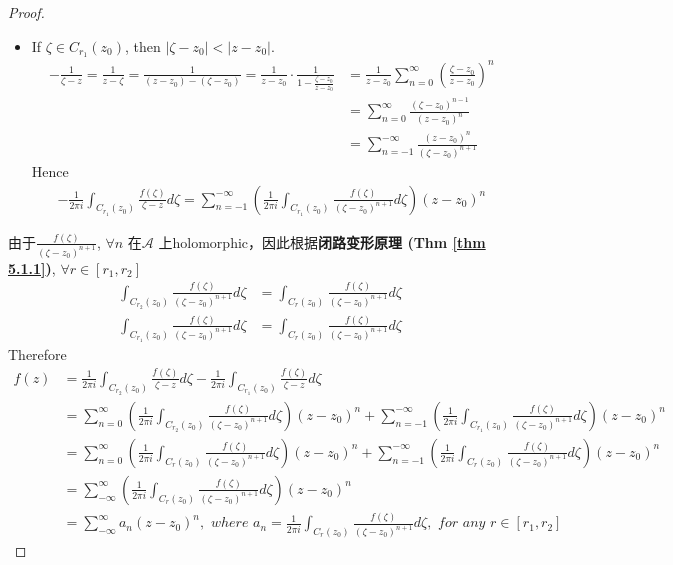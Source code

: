 \begin{thm}
\begin{proof}
\begin{itemize}
			\item If $\zeta \in C_{r_1}(z_0)$, then $\left| \zeta - z_0 \right| < \left| z - z_0 \right|$.
			\begin{align}
				-\frac{1}{\zeta - z} 
				= \frac{1}{z - \zeta}
				= \frac{1}{(z - z_0) - (\zeta - z_0)}
				= \frac{1}{z - z_0} \cdot \frac{1}{1 - \frac{\zeta - z_0}{z - z_0}}
				&= \frac{1}{z - z_0} \sum_{n = 0}^{\infty}{\left( \frac{\zeta - z_0}{z - z_0} \right)^n} \\
				&= \sum_{n = 0}^{\infty}{\frac{(\zeta - z_0)^{n - 1}}{(z - z_0)^n}} \\
				&= \sum_{n = -1}^{-\infty}{\frac{(z - z_0)^n}{(\zeta - z_0)^{n + 1}}}
			\end{align}
			Hence
			\begin{align}
				-\frac{1}{2\pi i} \int_{C_{r_1}(z_0)}{\frac{f(\zeta)}{\zeta - z} d\zeta}
				= \sum_{n = -1}^{-\infty}{\left( \frac{1}{2\pi i} \int_{C_{r_1}(z_0)}{\frac{f(\zeta)}{(\zeta - z_0)^{n + 1}} d\zeta} \right) (z - z_0)^n}
			\end{align}
		\end{itemize}
		由于$\frac{f(\zeta)}{(\zeta - z_0)^{n + 1}}$, $\forall n$ 在$\mathcal{A}$ 上holomorphic，因此根据\textbf{闭路变形原理 (Thm \ref{thm 5.1.1})}, $\forall r \in [r_1 , r_2]$
		\begin{align}
			\int_{C_{r_2}(z_0)}{\frac{f(\zeta)}{(\zeta - z_0)^{n + 1} } d\zeta }
			&= \int_{C_{r}(z_0)}{\frac{f(\zeta)}{(\zeta - z_0)^{n + 1} } d\zeta } \\
			\int_{C_{r_1}(z_0)}{\frac{f(\zeta)}{(\zeta - z_0)^{n + 1} } d\zeta }
			&= \int_{C_{r}(z_0)}{\frac{f(\zeta)}{(\zeta - z_0)^{n + 1} } d\zeta }
		\end{align}
		Therefore
		\begin{align}
			f(z) 
			&= \frac{1}{2 \pi i} \int_{C_{r_2}(z_0)}{\frac{f(\zeta)}{\zeta - z} d\zeta} - \frac{1}{2 \pi i} \int_{C_{r_1}(z_0)}{\frac{f(\zeta)}{\zeta - z} d\zeta} \\
			&= \sum_{n = 0}^{\infty}{\left( \frac{1}{2 \pi i} \int_{C_{r_2}(z_0)}{\frac{f(\zeta)}{(\zeta - z_0)^{n + 1} } d\zeta } \right) (z - z_0)^n} + \sum_{n = -1}^{-\infty}{\left( \frac{1}{2\pi i} \int_{C_{r_1}(z_0)}{\frac{f(\zeta)}{(\zeta - z_0)^{n + 1}} d\zeta} \right) (z - z_0)^n} \\
			&= \sum_{n = 0}^{\infty}{\left( \frac{1}{2 \pi i} \int_{C_{r}(z_0)}{\frac{f(\zeta)}{(\zeta - z_0)^{n + 1} } d\zeta } \right) (z - z_0)^n} + \sum_{n = -1}^{-\infty}{\left( \frac{1}{2\pi i} \int_{C_{r}(z_0)}{\frac{f(\zeta)}{(\zeta - z_0)^{n + 1}} d\zeta} \right) (z - z_0)^n} \\
			&= \sum_{-\infty}^{\infty}{\left( \frac{1}{2 \pi i} \int_{C_{r}(z_0)}{\frac{f(\zeta)}{(\zeta - z_0)^{n + 1} } d\zeta } \right) (z - z_0)^n} \\
			&= \sum_{- \infty}^{\infty}{a_n (z - z_0)^n}, \,\,where \,\, a_n = \frac{1}{2\pi i} \int_{C_{r}(z_0)}{\frac{f(\zeta)}{(\zeta - z_0)^{n + 1}} d\zeta} , \,\, for \,\, any \,\, r \in [r_1 , r_2]
		\end{align}
	\end{proof}
\end{thm}

